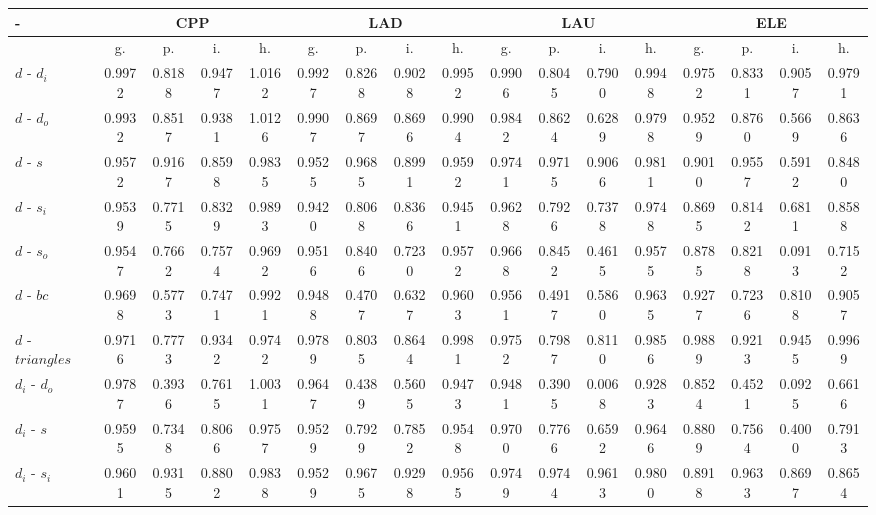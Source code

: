 \documentclass[%
 aip,
 jmp,%
 amsmath,amssymb,
 reprint,%
 floatfix,
]{revtex4-1}
\begin{document}
\begin{table}
  \centering
    \footnotesize
\setlength{\tabcolsep}{.26667em}
  \begin{tabular}{|l|| c|c|c|c||  c|c|c|c||   c|c|c|c||   c|c|c|c|}\hline
-\-  & \multicolumn{4}{c|}{CPP} & \multicolumn{4}{c|}{LAD} & \multicolumn{4}{c|}{LAU} & \multicolumn{4}{c|}{ELE} \\ \hline
 & g. & p. & i. & h. &     g. & p. & i. & h. &    g. & p. & i. & h. &    g. & p. & i. & h. \\\hline
$d$ - $d_i$ & 0.9972 & 0.8188 & 0.9477 & 1.0162 & 0.9927 & 0.8268 & 0.9028 & 0.9952 & 0.9906 & 0.8045 & 0.7900 & 0.9948 & 0.9752 & 0.8331 & 0.9057 & 0.9791 \\ \hline
$d$ - $d_o$ & 0.9932 & 0.8517 & 0.9381 & 1.0126 & 0.9907 & 0.8697 & 0.8696 & 0.9904 & 0.9842 & 0.8624 & 0.6289 & 0.9798 & 0.9529 & 0.8760 & 0.5669 & 0.8636 \\ \hline
$d$ - $s$ & 0.9572 & 0.9167 & 0.8598 & 0.9835 & 0.9525 & 0.9685 & 0.8991 & 0.9592 & 0.9741 & 0.9715 & 0.9066 & 0.9811 & 0.9010 & 0.9557 & 0.5912 & 0.8480 \\ \hline
$d$ - $s_i$ & 0.9539 & 0.7715 & 0.8329 & 0.9893 & 0.9420 & 0.8068 & 0.8366 & 0.9451 & 0.9628 & 0.7926 & 0.7378 & 0.9748 & 0.8695 & 0.8142 & 0.6811 & 0.8588 \\ \hline
$d$ - $s_o$ & 0.9547 & 0.7662 & 0.7574 & 0.9692 & 0.9516 & 0.8406 & 0.7230 & 0.9572 & 0.9668 & 0.8452 & 0.4615 & 0.9575 & 0.8785 & 0.8218 & 0.0913 & 0.7152 \\ \hline
$d$ - $bc$ & 0.9698 & 0.5773 & 0.7471 & 0.9921 & 0.9488 & 0.4707 & 0.6327 & 0.9603 & 0.9561 & 0.4917 & 0.5860 & 0.9635 & 0.9277 & 0.7236 & 0.8108 & 0.9057 \\ \hline
$d$ - $triangles$ & 0.9716 & 0.7773 & 0.9342 & 0.9742 & 0.9789 & 0.8035 & 0.8644 & 0.9981 & 0.9752 & 0.7987 & 0.8110 & 0.9856 & 0.9889 & 0.9213 & 0.9455 & 0.9969 \\ \hline
$d_i$ - $d_o$ & 0.9787 & 0.3936 & 0.7615 & 1.0031 & 0.9647 & 0.4389 & 0.5605 & 0.9473 & 0.9481 & 0.3905 & 0.0068 & 0.9283 & 0.8524 & 0.4521 & 0.0925 & 0.6616 \\ \hline
$d_i$ - $s$ & 0.9595 & 0.7348 & 0.8066 & 0.9757 & 0.9529 & 0.7929 & 0.7852 & 0.9548 & 0.9700 & 0.7766 & 0.6592 & 0.9646 & 0.8809 & 0.7564 & 0.4000 & 0.7913 \\ \hline
$d_i$ - $s_i$ & 0.9601 & 0.9315 & 0.8802 & 0.9838 & 0.9529 & 0.9675 & 0.9298 & 0.9565 & 0.9749 & 0.9744 & 0.9613 & 0.9800 & 0.8918 & 0.9633 & 0.8697 & 0.8654 \\ \hline

\end{tabular}
\end{table}
\end{document}
